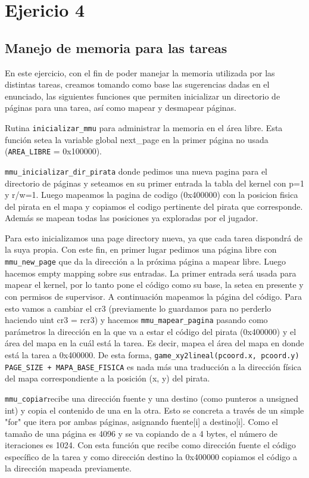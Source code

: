 \section{Ejericio 4}

\subsection{Manejo de memoria para las tareas}

En este ejercicio, con el fin de poder manejar la memoria utilizada por las distintas tareas, creamos tomando como base las sugerencias dadas en el enunciado, las siguientes funciones que permiten inicializar un directorio de páginas para una tarea, así como mapear y desmapear páginas.

Rutina \texttt{inicializar\_mmu} para administrar la memoria en el área libre. Esta función setea la variable global next\_page en la primer página no usada (\texttt{AREA\_LIBRE} = 0x100000). 

\texttt{mmu\_inicializar\_dir\_pirata}  donde pedimos una nueva pagina para el directorio de páginas y seteamos en su primer entrada la tabla del kernel con p=1 y r/w=1. Luego mapeamos la pagina de codigo (0x400000) con la posicion fisica del pirata en el mapa y copiamos el codigo pertinente del pirata que corresponde. Además se mapean todas las posiciones ya exploradas por el jugador.

Para esto inicializamos una page directory nueva, ya que cada tarea dispondrá de la suya propia. Con este fin, en primer lugar pedimos una página libre con \texttt{mmu\_new\_page} que da la dirección a la próxima página a mapear libre. Luego hacemos empty mapping sobre sus entradas.
La primer entrada será usada para mapear el kernel, por lo tanto pone el código como su base, la setea en presente y con permisos de supervisor.
A continuación mapeamos la página del código. Para esto vamos a cambiar el cr3 (previamente lo guardamos para no perderlo haciendo uint cr3 = rcr3) y hacemos \texttt{mmu\_mapear\_pagina} pasando como parámetros la dirección en la que va a estar el código del pirata (0x400000) y el área del mapa en la cuál está la tarea. Es decir, mapea el área del mapa en donde está la tarea a 0x400000. 
De esta forma, \texttt{game\_xy2lineal(p\-\>coord.x, p\-\>coord.y) \* PAGE\_SIZE + MAPA\_BASE\_FISICA} es nada más una traducción a la dirección física del mapa correspondiente a la posición (x, y) del pirata.

\texttt{mmu\_copiar}recibe una dirección fuente y una destino (como punteros a unsigned int) y copia el contenido de una en la otra.
Esto se concreta a través de un simple "for" que itera por ambas páginas, asignando fuente[i] a destino[i]. Como el tamaño de una página es 4096 y se va copiando de a 4 bytes, el número de iteraciones es 1024. Con esta función que recibe como dirección fuente el código específico de la tarea y como dirección destino la 0x400000 copiamos el código a la dirección mapeada previamente.


